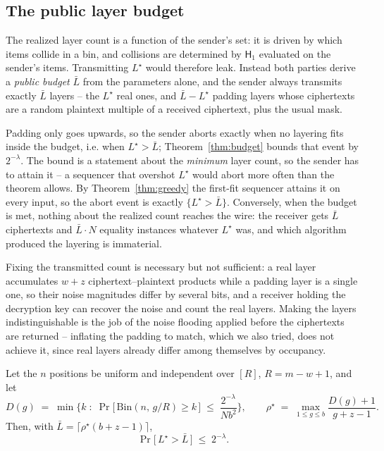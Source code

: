 \subsection{The public layer budget}
\label{subsec:budget}

The realized layer count is a function of the sender's set: it is driven by
which items collide in a bin, and collisions are determined by
$\mathsf{H}_1$ evaluated on the sender's items. Transmitting $L^\star$ would
therefore leak. Instead both parties derive a \emph{public budget}
$\bar{L}$ from the parameters alone, and the sender always transmits exactly
$\bar{L}$ layers -- the $L^\star$ real ones, and $\bar{L} - L^\star$ padding
layers whose ciphertexts are a random plaintext multiple of a received
ciphertext, plus the usual mask.

Padding only goes upwards, so the sender aborts exactly when no layering fits
inside the budget, i.e. when $L^\star > \bar{L}$; Theorem~\ref{thm:budget}
bounds that event by $2^{-\lambda}$. The bound is a statement about the
\emph{minimum} layer count, so the sender has to attain it -- a sequencer
that overshot $L^\star$ would abort more often than the theorem allows. By
Theorem~\ref{thm:greedy} the first-fit sequencer attains it on every input,
so the abort event is exactly $\{L^\star > \bar{L}\}$. Conversely, when the budget is met, nothing about the realized count reaches
the wire: the receiver gets $\bar{L}$ ciphertexts and $\bar{L} \cdot N$
equality instances whatever $L^\star$ was, and which algorithm produced the
layering is immaterial.

\begin{remark}
Fixing the transmitted count is necessary but not sufficient: a real layer
accumulates $w + z$ ciphertext--plaintext products while a padding layer is a
single one, so their noise magnitudes differ by several bits, and a receiver
holding the decryption key can recover the noise and count the real layers.
Making the layers indistinguishable is the job of the noise flooding applied
before the ciphertexts are returned -- inflating the padding to match, which we
also tried, does not achieve it, since real layers already differ among
themselves by occupancy.
\end{remark}

\begin{theorem}
\label{thm:budget}
Let the $n$ positions be uniform and independent over $[R]$, $R = m-w+1$, and
let
\[
  D(g) \;=\; \min\Big\{ k \;:\;
     \Pr\big[\,\mathrm{Bin}(n,\, g/R) \ge k \,\big] \;\le\;
     \frac{2^{-\lambda}}{N b^2} \Big\},
  \qquad
  \rho^\star \;=\; \max_{1 \le g \le b} \frac{D(g)+1}{g+z-1}.
\]
Then, with $\bar{L} = \lceil \rho^\star (b+z-1) \rceil$,
\[
  \Pr\big[\, L^\star > \bar{L} \,\big] \;\le\; 2^{-\lambda}.
\]
\end{theorem}

